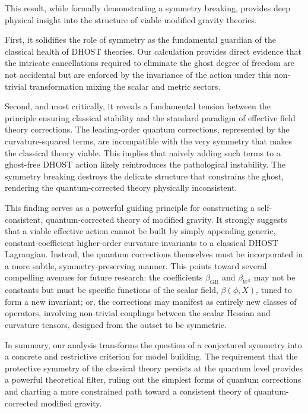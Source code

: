 \documentclass[twocolumn]{aastex631}
\begin{document}
This result, while formally demonstrating a symmetry breaking, provides deep physical insight into the structure of viable modified gravity theories.

First, it solidifies the role of symmetry as the fundamental guardian of the classical health of DHOST theories. Our calculation provides direct evidence that the intricate cancellations required to eliminate the ghost degree of freedom are not accidental but are enforced by the invariance of the action under this non-trivial transformation mixing the scalar and metric sectors.

Second, and most critically, it reveals a fundamental tension between the principle ensuring classical stability and the standard paradigm of effective field theory corrections. The leading-order quantum corrections, represented by the curvature-squared terms, are incompatible with the very symmetry that makes the classical theory viable. This implies that naively adding such terms to a ghost-free DHOST action likely reintroduces the pathological instability. The symmetry breaking destroys the delicate structure that constrains the ghost, rendering the quantum-corrected theory physically inconsistent.

This finding serves as a powerful guiding principle for constructing a self-consistent, quantum-corrected theory of modified gravity. It strongly suggests that a viable effective action cannot be built by simply appending generic, constant-coefficient higher-order curvature invariants to a classical DHOST Lagrangian. Instead, the quantum corrections themselves must be incorporated in a more subtle, symmetry-preserving manner. This points toward several compelling avenues for future research: the coefficients $\beta_{\text{GB}}$ and $\beta_{W^2}$ may not be constants but must be specific functions of the scalar field, $\beta(\phi, X)$, tuned to form a new invariant; or, the corrections may manifest as entirely new classes of operators, involving non-trivial couplings between the scalar Hessian and curvature tensors, designed from the outset to be symmetric.

In summary, our analysis transforms the question of a conjectured symmetry into a concrete and restrictive criterion for model building. The requirement that the protective symmetry of the classical theory persists at the quantum level provides a powerful theoretical filter, ruling out the simplest forms of quantum corrections and charting a more constrained path toward a consistent theory of quantum-corrected modified gravity.
\end{document}
